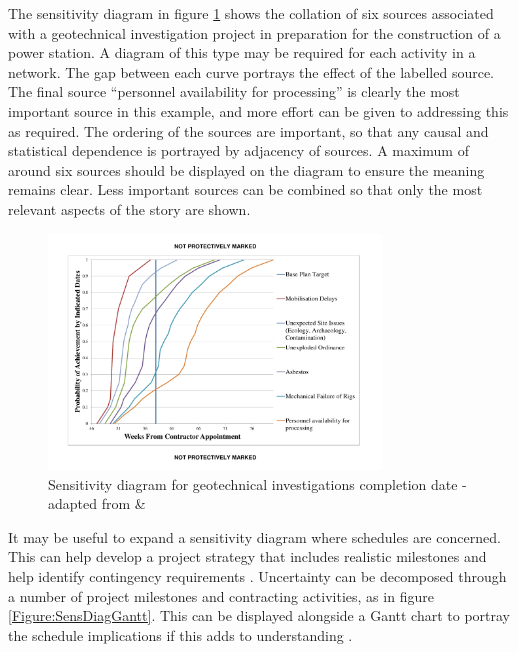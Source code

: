 The sensitivity diagram in figure \ref{Figure:SensDiag} shows the collation of six sources associated with a geotechnical investigation project in preparation for the construction of a power station.
A diagram of this type may be required for each activity in a network.
The gap between each curve portrays the effect of the labelled source.
The final source ``personnel availability for processing'' is clearly the most important source in this example, and more effort can be given to addressing this as required. 
The ordering of the sources are important, so that any causal and statistical dependence is portrayed by adjacency of sources.
A maximum of around six sources should be displayed on the diagram to ensure the meaning remains clear.
Less important sources can be combined so that only the most relevant aspects of the story are shown.

\begin{figure}[!h]
  \centering
    \includegraphics[width = 0.79\textwidth]{./Figures/Sensitivity_Diagram.pdf} 
\caption{Sensitivity diagram for geotechnical investigations completion date - adapted from \cite{chapman} \& \cite{hopkinson2008}}
\label{Figure:SensDiag}
\end{figure}

It may be useful to expand a sensitivity diagram where schedules are concerned. 
This can help develop a project strategy that includes realistic milestones and help identify contingency requirements \citep{hopkinson2008}.
Uncertainty can be decomposed through a number of project milestones and contracting activities, as in figure \ref{Figure:SensDiagGantt}.
This can be displayed alongside a Gantt chart to portray the schedule implications if this adds to understanding \citep{hopkinson2008}.

